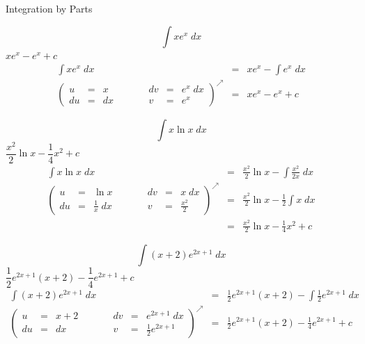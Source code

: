 \documentclass{article}
\begin{document}
\begin{category}{Integration by Parts}

  \begin{clue}
    \[ \int x e^{x} \; dx \]
  \response
    $x e^{x} - e^{x} + c$
  \solution
    \[
    \begin{array}{rcl}
    {\displaystyle \int x e^{x} \; dx} & = & {\displaystyle x e^{x} - \int e^{x} \; dx} \\
    \left( \begin{array}{rclcrcl}
    u & = & x & \qquad & dv & = & e^{x} \; dx \\
    du & = & dx & \qquad & v & = & e^{x}
    \end{array} \right)^{\nearrow} & = & {\displaystyle x e^{x} - e^{x} + c}
    \end{array}
    \]
  \end{clue}

  \begin{clue}
    \[ \int x \ln x \; dx \]
  \response
    $\dfrac{x^{2}}{2} \ln x - \dfrac{1}{4} x^{2} + c$
  \solution
    \[
    \begin{array}{rcl}
    {\displaystyle \int x \ln x \; dx} & = & {\displaystyle \frac{x^{2}}{2} \ln x - \int \frac{x^{2}}{2x} \; dx } \\
    \left( \begin{array}{rclcrcl}
    u & = & \ln x & \qquad & dv & = & x \; dx \\
    du & = & {\displaystyle \frac{1}{x} \; dx} & \qquad & v & = & {\displaystyle \frac{x^{2}}{2} }
    \end{array} \right)^{\nearrow} & = & {\displaystyle \frac{x^{2}}{2} \ln x - \frac{1}{2} \int x \; dx } \\
     & = & {\displaystyle \frac{x^{2}}{2} \ln x - \frac{1}{4} x^{2} + c}
    \end{array}
    \]
  \end{clue}

  \begin{clue}
    \[ \int (x+2) e^{2x+1} \; dx \]
  \response
    $\dfrac{1}{2}e^{2x+1}(x+2) - \dfrac{1}{4}e^{2x+1} + c$
  \solution
    \[
    \begin{array}{rcl}
    {\displaystyle \int (x+2) e^{2x+1} \; dx} & = & {\displaystyle \frac{1}{2}e^{2x+1}(x+2) - \int \frac{1}{2}e^{2x+1} \; dx} \\
    \left( \begin{array}{rclcrcl}
    u & = & x+2 & \qquad & dv & = & {\displaystyle e^{2x+1} \; dx} \\
    du & = & dx & \qquad & v & = & {\displaystyle  \frac{1}{2}e^{2x+1}}
    \end{array} \right)^{\nearrow} & = & {\displaystyle \frac{1}{2}e^{2x+1}(x+2) - \frac{1}{4}e^{2x+1}  + c}
    \end{array}
    \]
  \end{clue}


\end{category}
\end{document}
